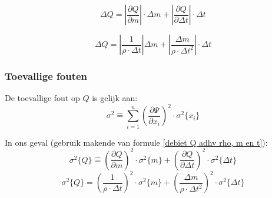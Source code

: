 \begin{equation*}
    \Delta Q = \left|\frac{\partial Q}{\partial m}\right|\cdot \Delta m + \left| \frac{\partial Q}{\partial \Delta t}\right| \cdot \Delta t
\end{equation*}

\begin{equation*}
    \Delta Q = \left|\frac{1}{\rho \cdot \Delta t}\right|\Delta m + \left|\frac{\Delta m}{\rho \cdot \Delta t^{2}}\right|\cdot \Delta t
\end{equation*}


\subsubsection{Toevallige fouten}
De toevallige fout op $Q$ is gelijk aan:
\begin{equation}
    \sigma^{2} \hat = \sum\limits_{i=1}^n(\frac{\partial \Psi}{\partial x_i})^{2} \cdot \sigma^{2} \{x_i\}
\end{equation}

In ons geval (gebruik makende van formule \eqref{debiet Q adhv rho, m en t}):
\begin{equation*}
    \sigma^{2}\{Q\} \hat = (\frac{\partial Q}{\partial m})^{2} \cdot \sigma^{2}\{m\} + (\frac{\partial Q}{\partial \Delta t})^{2} \cdot \sigma^{2}\{\Delta t\}
\end{equation*}
\begin{equation*}
\sigma^{2}\{Q\} = (\frac{1}{\rho \cdot \Delta t})^{2} \cdot \sigma^{2}\{m\} + (\frac{\Delta m}{\rho \cdot \Delta t^{2}})^{2} \cdot \sigma^{2}\{\Delta t\}
\end{equation*}





